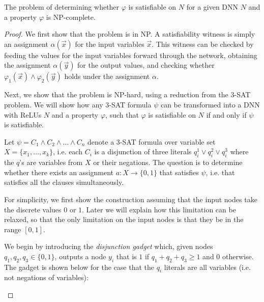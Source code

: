 \documentclass[a4paper]{llncs}
\newcommand{\assignment}{\alpha{}}
\begin{document}
\begin{claim}
The problem of determining whether $\varphi$ is satisfiable on $N$ for a given DNN
$N$ and a property $\varphi$ is NP-complete.
\end{claim}
\begin{proof}
We first show that the problem is in NP.
A satisfiability witness is simply an assignment $\assignment(\vec{x})$ for the input
variables $\vec{x}$.
 This witness can be checked by feeding the values for the
input variables forward through the network, obtaining the assignment
$\assignment(\vec{y})$ for the output
values, and checking whether $\varphi_1(\vec{x})\wedge\varphi_2(\vec{y})$ holds under the
assignment $\assignment$.

Next, we show that the problem is NP-hard, using a reduction from the
3-SAT problem. We will show how any 3-SAT formula $\psi$ can be transformed
into a DNN with ReLUs $N$ and a property $\varphi$, such that $\varphi$ is
satisfiable on $N$ if and only
if $\psi$ is satisfiable.

Let $\psi = C_1\wedge C_2\wedge\ldots\wedge C_n$ denote
a 3-SAT formula over variable set $X = \{x_1,\ldots, x_k\}$, i.e. each $C_i$
is a disjunction of three literals $q_i^1 \vee q_i^2 \vee q_i^3$ where
the $q$'s are variables from $X$ or their negations. The question is to
determine whether there exists an assignment $a:X\rightarrow \{0,1\}$
that satisfies $\psi$, i.e. that satisfies all the clauses simultaneously.

For simplicity, we first show the construction assuming that the input
nodes take the discrete values $0$ or $1$. Later we will explain how
this limitation can be relaxed, so that the only limitation on the
input nodes is that they be in the range $[0,1]$.

We begin by introducing the \emph{disjunction gadget} which, given
nodes $q_1,q_2,q_3\in\{0,1\}$, outputs a node $y_i$ that is $1$ if
$q_1+ q_2+ q_3\geq 1$ and $0$ otherwise. The gadget is shown below for the case that
the  $q_i$ literals are all variables (i.e. not negations of variables):
\begin{figure}[H]
\centering
{}
\end{figure}
\end{proof}
\end{document}
